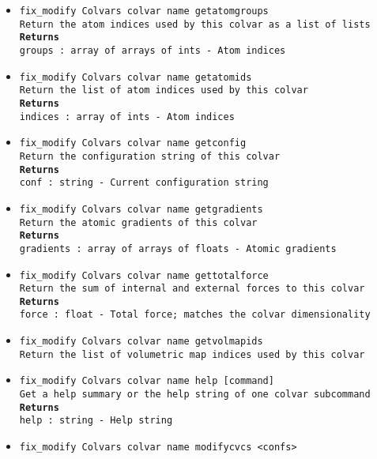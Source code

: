 \begin{itemize}
\item \texttt{fix\_modify Colvars colvar name getatomgroups}
\\
\texttt{Return the atom indices used by this colvar as a list of lists}
\\
\texttt{\textbf{Returns}}
\\
\texttt{groups : array of arrays of ints - Atom indices}
\item \texttt{fix\_modify Colvars colvar name getatomids}
\\
\texttt{Return the list of atom indices used by this colvar}
\\
\texttt{\textbf{Returns}}
\\
\texttt{indices : array of ints - Atom indices}
\item \texttt{fix\_modify Colvars colvar name getconfig}
\\
\texttt{Return the configuration string of this colvar}
\\
\texttt{\textbf{Returns}}
\\
\texttt{conf : string - Current configuration string}
\item \texttt{fix\_modify Colvars colvar name getgradients}
\\
\texttt{Return the atomic gradients of this colvar}
\\
\texttt{\textbf{Returns}}
\\
\texttt{gradients : array of arrays of floats - Atomic gradients}
\item \texttt{fix\_modify Colvars colvar name gettotalforce}
\\
\texttt{Return the sum of internal and external forces to this colvar}
\\
\texttt{\textbf{Returns}}
\\
\texttt{force : float - Total force; matches the colvar dimensionality}
\item \texttt{fix\_modify Colvars colvar name getvolmapids}
\\
\texttt{Return the list of volumetric map indices used by this colvar}
\item \texttt{fix\_modify Colvars colvar name help [command]}
\\
\texttt{Get a help summary or the help string of one colvar subcommand}
\\
\texttt{\textbf{Returns}}
\\
\texttt{help : string - Help string}
\item \texttt{fix\_modify Colvars colvar name modifycvcs <confs>}
\\

\end{itemize}
